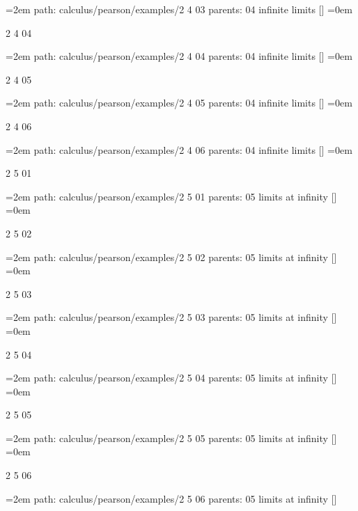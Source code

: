 \leftskip=2em
path: calculus/pearson/examples/2 4 03
\smallskip
parents:  04 infinite limits []
\smallskip
\leftskip=0em
\par\endgroup
\bigskip
{}
2 4 04
\smallskip
\par\begingroup
\leftskip=2em
path: calculus/pearson/examples/2 4 04
\smallskip
parents:  04 infinite limits []
\smallskip
\leftskip=0em
\par\endgroup
\bigskip
{}
2 4 05
\smallskip
\par\begingroup
\leftskip=2em
path: calculus/pearson/examples/2 4 05
\smallskip
parents:  04 infinite limits []
\smallskip
\leftskip=0em
\par\endgroup
\bigskip
{}
2 4 06
\smallskip
\par\begingroup
\leftskip=2em
path: calculus/pearson/examples/2 4 06
\smallskip
parents:  04 infinite limits []
\smallskip
\leftskip=0em
\par\endgroup
\bigskip
{}
2 5 01
\smallskip
\par\begingroup
\leftskip=2em
path: calculus/pearson/examples/2 5 01
\smallskip
parents:  05 limits at infinity []
\smallskip
\leftskip=0em
\par\endgroup
\bigskip
{}
2 5 02
\smallskip
\par\begingroup
\leftskip=2em
path: calculus/pearson/examples/2 5 02
\smallskip
parents:  05 limits at infinity []
\smallskip
\leftskip=0em
\par\endgroup
\bigskip
{}
2 5 03
\smallskip
\par\begingroup
\leftskip=2em
path: calculus/pearson/examples/2 5 03
\smallskip
parents:  05 limits at infinity []
\smallskip
\leftskip=0em
\par\endgroup
\bigskip
{}
2 5 04
\smallskip
\par\begingroup
\leftskip=2em
path: calculus/pearson/examples/2 5 04
\smallskip
parents:  05 limits at infinity []
\smallskip
\leftskip=0em
\par\endgroup
\bigskip
{}
2 5 05
\smallskip
\par\begingroup
\leftskip=2em
path: calculus/pearson/examples/2 5 05
\smallskip
parents:  05 limits at infinity []
\smallskip
\leftskip=0em
\par\endgroup
\bigskip
{}
2 5 06
\smallskip
\par\begingroup
\leftskip=2em
path: calculus/pearson/examples/2 5 06
\smallskip
parents:  05 limits at infinity []
